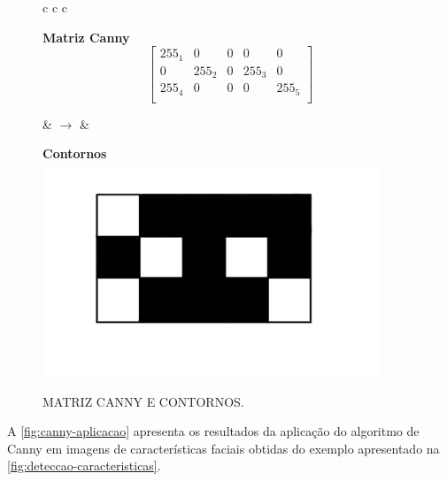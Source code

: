 \begin{figure}[ht]
    \caption{MATRIZ CANNY E CONTORNOS.}
    \label{fig:canny-contornos}
    \centering
    \begin{tabular}{c c c}
        \begin{minipage}{0.4\textwidth}
            \centering
            \textbf{Matriz Canny}\\ [0.2cm]
            \[
            \begin{bmatrix}
                255_1 & 0 & 0 & 0 & 0 \\
                0 & 255_2 & 0 & 255_3 & 0 \\
                255_4 & 0 & 0 & 0 & 255_5 \\
            \end{bmatrix}
            \]
        \end{minipage}
        \hspace{0.5cm}
        
        & $\rightarrow$ &
        \begin{minipage}{0.4\textwidth}
            \centering
            \textbf{Contornos}\\ [0.2cm]
            \includegraphics[width=0.9\textwidth]{fig/contorno_canny.jpeg}
        \end{minipage}
    \end{tabular}
\end{figure}

A \autoref{fig:canny-aplicacao} apresenta os resultados da aplicação do algoritmo de Canny em imagens de características faciais obtidas do exemplo apresentado na \autoref{fig:deteccao-caracteristicas}. 


